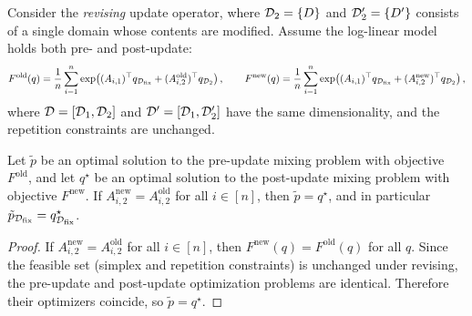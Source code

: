 \begin{lemma}\label{lem:rev_exactness}
Consider the \emph{revising} update operator, where $\mathcal{D}_2=\{D\}$ and $\mathcal{D}_2'=\{D'\}$ consists of a single domain whose contents are modified.
Assume the log-linear model holds both pre- and post-update:
\[
F^{\mathrm{old}}(q) = \frac{1}{n}\sum_{i=1}^n \exp\!\left((A_{i,1})^\top q_{\mathcal{D}_{\text{fix}}} + (A_{i,2}^{\mathrm{old}})^\top q_{\mathcal{D}_2}\right),
\qquad
F^{\mathrm{new}}(q) = \frac{1}{n}\sum_{i=1}^n \exp\!\left((A_{i,1})^\top q_{\mathcal{D}_{\text{fix}}} + (A_{i,2}^{\mathrm{new}})^\top q_{\mathcal{D}_2}\right),
\]
where $\mathcal{D}=[\mathcal{D}_1,\mathcal{D}_2]$ and $\mathcal{D}'=[\mathcal{D}_1,\mathcal{D}_2']$ have the same dimensionality, and the repetition constraints are unchanged.

Let $\tilde p$ be an optimal solution to the pre-update mixing problem with objective $F^{\mathrm{old}}$, and let $q^\star$ be an optimal solution to the post-update mixing problem with objective $F^{\mathrm{new}}$.
If $A_{i,2}^{\mathrm{new}} = A_{i,2}^{\mathrm{old}}$ for all $i\in[n]$, then $\tilde p = q^\star$, and in particular $\tilde p_{\mathcal{D}_{\text{fix}}}=q^\star_{\mathcal{D}_{\text{fix}}}$.
\end{lemma}

\begin{proof}
If $A_{i,2}^{\mathrm{new}} = A_{i,2}^{\mathrm{old}}$ for all $i\in[n]$, then $F^{\mathrm{new}}(q)=F^{\mathrm{old}}(q)$ for all $q$.
Since the feasible set (simplex and repetition constraints) is unchanged under revising, the pre-update and post-update optimization problems are identical.
Therefore their optimizers coincide, so $\tilde p=q^\star$.
\end{proof}

